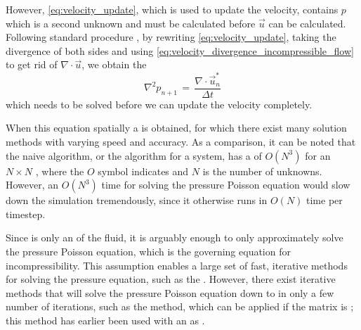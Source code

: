 However, \eqref{eq:velocity_update}, which is used to update the velocity, contains $p$ which is a second unknown and must be calculated before $\vec{u}$ can be calculated. Following standard procedure \citep{Losasso2004}, by rewriting \eqref{eq:velocity_update}, taking the divergence of both sides and using \eqref{eq:velocity_divergence_incompressible_flow} to get rid of $\nabla\cdot\vec{u}$, we obtain the 
%
\begin{equation} \label{eq:pressure_poisson_equation_incompressible_flow}
\nabla^2 p_{n+1} \,=\, \frac{\nabla\cdot\vec{u}^*_n}{\Delta t}
\end{equation}
%
which needs to be solved before we can update the velocity completely.

When  this equation spatially a  is obtained, for which there exist many solution methods with varying speed and accuracy. As a comparison, it can be noted that the naive  algorithm, or the  algorithm for a  system, has a  of $O(N^3)$ for an $N\times N$ , where the $O$ symbol indicates  and $N$ is the number of unknowns. However, an $O(N^3)$ time for solving the pressure Poisson equation would slow down the simulation tremendously, since it otherwise runs in $O(N)$ time per timestep.

Since \incompressibility is only an \approximate \property of the fluid, it is arguably enough to only approximately solve the pressure Poisson equation, which is the governing equation for incompressibility. This assumption enables a large set of fast, iterative methods for solving the pressure equation, such as the   \citep{Popinet2003}. However, there exist iterative methods that will solve the pressure Poisson equation down to  in only a few number of iterations, such as the \PCG method, which can be applied if the matrix is ; this method has earlier been used with an  as \preconditioner \citep{Losasso2004}.

